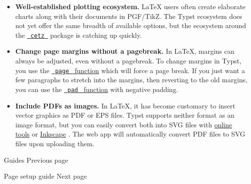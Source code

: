 \begin{itemize}
\item
  \textbf{Well-established plotting ecosystem.} LaTeX users often create
  elaborate charts along with their documents in PGF/TikZ. The Typst
  ecosystem does not yet offer the same breadth of available options,
  but the ecosystem around the
  \href{https://github.com/cetz-package/cetz}{\texttt{\ cetz\ }} package
  is catching up quickly.
\item
  \textbf{Change page margins without a pagebreak.} In LaTeX, margins
  can always be adjusted, even without a pagebreak. To change margins in
  Typst, you use the
  \href{/docs/reference/layout/page/}{\texttt{\ page\ } function} which
  will force a page break. If you just want a few paragraphs to stretch
  into the margins, then reverting to the old margins, you can use the
  \href{/docs/reference/layout/pad/}{\texttt{\ pad\ } function} with
  negative padding.
\item
  \textbf{Include PDFs as images.} In LaTeX, it has become customary to
  insert vector graphics as PDF or EPS files. Typst supports neither
  format as an image format, but you can easily convert both into SVG
  files with \href{https://cloudconvert.com/pdf-to-svg}{online tools} or
  \href{https://inkscape.org/}{Inkscape} . The web app will
  automatically convert PDF files to SVG files upon uploading them.
\end{itemize}

\href{/docs/guides/}{\pandocbounded{}}

{ Guides } { Previous page }

\href{/docs/guides/page-setup-guide/}{\pandocbounded{}}

{ Page setup guide } { Next page }
